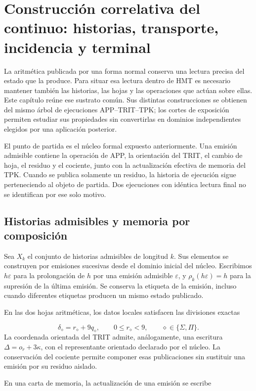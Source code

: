\section{Construcción correlativa del continuo: historias, transporte, incidencia y terminal}
\label{iv:continuo-conjunto}
La aritmética publicada por una forma normal conserva una lectura precisa del estado que la produce. Para situar esa lectura dentro de HMT es necesario mantener también las historias, las hojas y las operaciones que actúan sobre ellas. Este capítulo reúne ese sustrato común. Sus distintas construcciones se obtienen del mismo árbol de ejecuciones APP–TRIT–TPK; los cortes de exposición permiten estudiar sus propiedades sin convertirlas en dominios independientes elegidos por una aplicación posterior.

El punto de partida es el núcleo formal expuesto anteriormente. Una emisión admisible contiene la operación de APP, la orientación del TRIT, el cambio de hoja, el residuo y el cociente, junto con la actualización efectiva de memoria del TPK. Cuando se publica solamente un residuo, la historia de ejecución sigue perteneciendo al objeto de partida. Dos ejecuciones con idéntica lectura final no se identifican por ese solo motivo.

\subsection{Historias admisibles y memoria por composición}
\label{iv:cont:historias}
Sea \(X_k\) el conjunto de historias admisibles de longitud \(k\). Sus elementos se construyen por emisiones sucesivas desde el dominio inicial del núcleo. Escribimos \(h\varepsilon\) para la prolongación de \(h\) por una emisión admisible \(\varepsilon\), y \(\rho_k(h\varepsilon)=h\) para la supresión de la última emisión. Se conserva la etiqueta de la emisión, incluso cuando diferentes etiquetas producen un mismo estado publicado.

En las dos hojas aritméticas, los datos locales satisfacen las divisiones exactas

\[
\delta_\diamond=r_\diamond+9q_\diamond,
\qquad 0\leq r_\diamond<9,
\qquad \diamond\in\{\Sigma,\Pi\}.
\]
La coordenada orientada del TRIT admite, análogamente, una escritura \(\Delta=o_r+3\kappa\), con el representante orientado declarado por el núcleo. La conservación del cociente permite componer esas publicaciones sin sustituir una emisión por su residuo aislado.

En una carta de memoria, la actualización de una emisión se escribe

